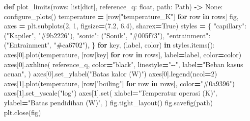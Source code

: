 \documentclass[
  12pt,a4paper,oneside]{report}
\newenvironment{Shaded}{\begin{snugshade}}{\end{snugshade}}
\newcommand{\BuiltInTok}[1]{#1}
\newcommand{\ControlFlowTok}[1]{\textcolor[rgb]{0.13,0.29,0.53}{\textbf{#1}}}
\newcommand{\DecValTok}[1]{\textcolor[rgb]{0.00,0.00,0.81}{#1}}
\newcommand{\FloatTok}[1]{\textcolor[rgb]{0.00,0.00,0.81}{#1}}
\newcommand{\KeywordTok}[1]{\textcolor[rgb]{0.13,0.29,0.53}{\textbf{#1}}}
\newcommand{\NormalTok}[1]{#1}
\newcommand{\OperatorTok}[1]{\textcolor[rgb]{0.81,0.36,0.00}{\textbf{#1}}}
\newcommand{\StringTok}[1]{\textcolor[rgb]{0.31,0.60,0.02}{#1}}
\newcommand{\VariableTok}[1]{\textcolor[rgb]{0.00,0.00,0.00}{#1}}
\begin{document}
\begin{Shaded}
\begin{Highlighting}[]
\KeywordTok{def}\NormalTok{ plot\_limits(rows: }\BuiltInTok{list}\NormalTok{[}\BuiltInTok{dict}\NormalTok{], reference\_q: }\BuiltInTok{float}\NormalTok{, path: Path) }\OperatorTok{{-}\textgreater{}} \VariableTok{None}\NormalTok{:}
\NormalTok{    configure\_plots()}
\NormalTok{    temperature }\OperatorTok{=}\NormalTok{ [row[}\StringTok{"temperature\_K"}\NormalTok{] }\ControlFlowTok{for}\NormalTok{ row }\KeywordTok{in}\NormalTok{ rows]}
\NormalTok{    fig, axes }\OperatorTok{=}\NormalTok{ plt.subplots(}\DecValTok{2}\NormalTok{, }\DecValTok{1}\NormalTok{, figsize}\OperatorTok{=}\NormalTok{(}\FloatTok{7.2}\NormalTok{, }\FloatTok{6.4}\NormalTok{), sharex}\OperatorTok{=}\VariableTok{True}\NormalTok{)}
\NormalTok{    styles }\OperatorTok{=}\NormalTok{ \{}
        \StringTok{"capillary"}\NormalTok{: (}\StringTok{"Kapiler"}\NormalTok{, }\StringTok{"\#9b2226"}\NormalTok{),}
        \StringTok{"sonic"}\NormalTok{: (}\StringTok{"Sonik"}\NormalTok{, }\StringTok{"\#005f73"}\NormalTok{),}
        \StringTok{"entrainment"}\NormalTok{: (}\StringTok{"Entrainment"}\NormalTok{, }\StringTok{"\#ca6702"}\NormalTok{),}
\NormalTok{    \}}
    \ControlFlowTok{for}\NormalTok{ key, (label, color) }\KeywordTok{in}\NormalTok{ styles.items():}
\NormalTok{        axes[}\DecValTok{0}\NormalTok{].plot(temperature, [row[key] }\ControlFlowTok{for}\NormalTok{ row }\KeywordTok{in}\NormalTok{ rows], label}\OperatorTok{=}\NormalTok{label, color}\OperatorTok{=}\NormalTok{color)}
\NormalTok{    axes[}\DecValTok{0}\NormalTok{].axhline(}
\NormalTok{        reference\_q, color}\OperatorTok{=}\StringTok{"black"}\NormalTok{, linestyle}\OperatorTok{=}\StringTok{"{-}{-}"}\NormalTok{, label}\OperatorTok{=}\StringTok{"Beban kasus acuan"}\NormalTok{,}
\NormalTok{    )}
\NormalTok{    axes[}\DecValTok{0}\NormalTok{].set\_ylabel(}\StringTok{"Batas kalor (W)"}\NormalTok{)}
\NormalTok{    axes[}\DecValTok{0}\NormalTok{].legend(ncol}\OperatorTok{=}\DecValTok{2}\NormalTok{)}
\NormalTok{    axes[}\DecValTok{1}\NormalTok{].plot(temperature, [row[}\StringTok{"boiling"}\NormalTok{] }\ControlFlowTok{for}\NormalTok{ row }\KeywordTok{in}\NormalTok{ rows], color}\OperatorTok{=}\StringTok{"\#0a9396"}\NormalTok{)}
\NormalTok{    axes[}\DecValTok{1}\NormalTok{].set\_yscale(}\StringTok{"log"}\NormalTok{)}
\NormalTok{    axes[}\DecValTok{1}\NormalTok{].}\BuiltInTok{set}\NormalTok{(}
\NormalTok{        xlabel}\OperatorTok{=}\StringTok{"Temperatur operasi (K)"}\NormalTok{,}
\NormalTok{        ylabel}\OperatorTok{=}\StringTok{"Batas pendidihan (W)"}\NormalTok{,}
\NormalTok{    )}
\NormalTok{    fig.tight\_layout()}
\NormalTok{    fig.savefig(path)}
\NormalTok{    plt.close(fig)}



\end{Highlighting}
\end{Shaded}
\end{document}
